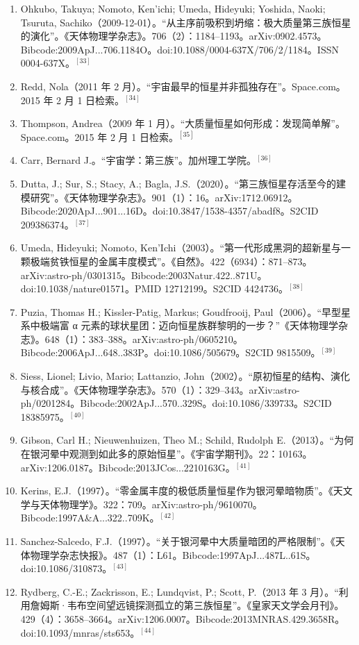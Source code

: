 \begin{enumerate}
\item Ohkubo, Takuya; Nomoto, Ken'ichi; Umeda, Hideyuki; Yoshida, Naoki; Tsuruta, Sachiko（2009-12-01）。“从主序前吸积到坍缩：极大质量第三族恒星的演化”。《天体物理学杂志》。706（2）：1184–1193。arXiv:0902.4573。Bibcode:2009ApJ...706.1184O。doi:10.1088/0004-637X/706/2/1184。ISSN 0004-637X。$^{[33]}$
\item Redd, Nola（2011 年 2 月）。“宇宙最早的恒星并非孤独存在”。Space.com。2015 年 2 月 1 日检索。$^{[34]}$
\item Thompson, Andrea（2009 年 1 月）。“大质量恒星如何形成：发现简单解”。Space.com。2015 年 2 月 1 日检索。$^{[35]}$
\item Carr, Bernard J.。“宇宙学：第三族”。加州理工学院。$^{[36]}$
\item Dutta, J.; Sur, S.; Stacy, A.; Bagla, J.S.（2020）。“第三族恒星存活至今的建模研究”。《天体物理学杂志》。901（1）：16。arXiv:1712.06912。Bibcode:2020ApJ...901...16D。doi:10.3847/1538-4357/abadf8。S2CID 209386374。$^{[37]}$
\item Umeda, Hideyuki; Nomoto, Ken'Ichi（2003）。“第一代形成黑洞的超新星与一颗极端贫铁恒星的金属丰度模式”。《自然》。422（6934）：871–873。arXiv:astro-ph/0301315。Bibcode:2003Natur.422..871U。doi:10.1038/nature01571。PMID 12712199。S2CID 4424736。$^{[38]}$
\item Puzia, Thomas H.; Kissler-Patig, Markus; Goudfrooij, Paul（2006）。“早型星系中极端富 α 元素的球状星团：迈向恒星族群黎明的一步？”《天体物理学杂志》。648（1）：383–388。arXiv:astro-ph/0605210。Bibcode:2006ApJ...648..383P。doi:10.1086/505679。S2CID 9815509。$^{[39]}$
\item Siess, Lionel; Livio, Mario; Lattanzio, John（2002）。“原初恒星的结构、演化与核合成”。《天体物理学杂志》。570（1）：329–343。arXiv:astro-ph/0201284。Bibcode:2002ApJ...570..329S。doi:10.1086/339733。S2CID 18385975。$^{[40]}$
\item Gibson, Carl H.; Nieuwenhuizen, Theo M.; Schild, Rudolph E.（2013）。“为何在银河晕中观测到如此多的原始恒星”。《宇宙学期刊》。22：10163。arXiv:1206.0187。Bibcode:2013JCos...2210163G。$^{[41]}$
\item Kerins, E.J.（1997）。“零金属丰度的极低质量恒星作为银河晕暗物质”。《天文学与天体物理学》。322：709。arXiv:astro-ph/9610070。Bibcode:1997A&A...322..709K。$^{[42]}$
\item Sanchez-Salcedo, F.J.（1997）。“关于银河晕中大质量暗团的严格限制”。《天体物理学杂志快报》。487（1）：L61。Bibcode:1997ApJ...487L..61S。doi:10.1086/310873。$^{[43]}$
\item Rydberg, C.-E.; Zackrisson, E.; Lundqvist, P.; Scott, P.（2013 年 3 月）。“利用詹姆斯·韦布空间望远镜探测孤立的第三族恒星”。《皇家天文学会月刊》。429（4）：3658–3664。arXiv:1206.0007。Bibcode:2013MNRAS.429.3658R。doi:10.1093/mnras/sts653。$^{[44]}$

\end{enumerate}
